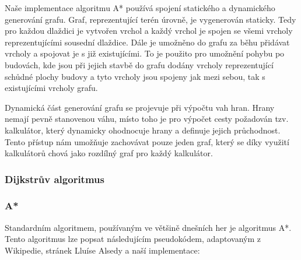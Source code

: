 Naše implementace algoritmu A* používá spojení statického a dynamického generování grafu. Graf, reprezentující terén úrovně, je vygenerován staticky. Tedy pro každou dlaždici je vytvořen vrchol a každý vrchol je spojen se všemi vrcholy reprezentujícími sousední dlaždice. Dále je umožněno do grafu za běhu přidávat vrcholy a spojovat je s již existujícími. To je použito pro umožnění pohybu po budovách, kde jsou při jejich stavbě do grafu dodány vrcholy reprezentující schůdné plochy budovy a tyto vrcholy jsou spojeny jak mezi sebou, tak s existujícími vrcholy grafu. 

Dynamická část generování grafu se projevuje při výpočtu vah hran. Hrany nemají pevně stanovenou váhu, místo toho je pro výpočet cesty požadován tzv. kalkulátor, který dynamicky ohodnocuje hrany a definuje jejich průchodnost. Tento přístup nám umožňuje zachovávat pouze jeden graf, který se díky využití kalkulátorů chová jako rozdílný graf pro každý kalkulátor.  

\subsubsection{Dijkstrův algoritmus}

\subsubsection{A*}
Standardním algoritmem, používaným ve většině dnešních her je algoritmus A*\citep{site:introastar}. Tento algoritmus lze popsat následujícím pseudokódem, adaptovaným z Wikipedie\citep{site:astarpseudowiki}, stránek Lluíse Alsedy\citep{site:astarpseudoalseda} a naší implementace:


